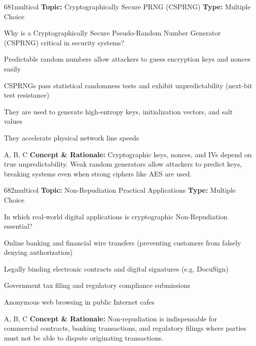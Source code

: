 \begin{qcard}{681}{multicol}
\textcolor{darkslate!75}{\small\textbf{Topic:} Cryptographically Secure PRNG (CSPRNG) \hfill \textbf{Type:} Multiple Choice}\vspace{0.4em}\par
Why is a Cryptographically Secure Pseudo-Random Number Generator (CSPRNG) critical in security systems?
\begin{qoptions}
\item Predictable random numbers allow attackers to guess encryption keys and nonces easily
\item CSPRNGs pass statistical randomness tests and exhibit unpredictability (next-bit test resistance)
\item They are used to generate high-entropy keys, initialization vectors, and salt values
\item They accelerate physical network line speeds
\end{qoptions}
\end{qcard}
\nopagebreak
\begin{explainbox}{A, B, C}
\textbf{Concept \& Rationale:} Cryptographic keys, nonces, and IVs depend on true unpredictability. Weak random generators allow attackers to predict keys, breaking systems even when strong ciphers like AES are used.
\end{explainbox}

\begin{qcard}{682}{multicol}
\textcolor{darkslate!75}{\small\textbf{Topic:} Non-Repudiation Practical Applications \hfill \textbf{Type:} Multiple Choice}\vspace{0.4em}\par
In which real-world digital applications is cryptographic Non-Repudiation essential?
\begin{qoptions}
\item Online banking and financial wire transfers (preventing customers from falsely denying authorization)
\item Legally binding electronic contracts and digital signatures (e.g. DocuSign)
\item Government tax filing and regulatory compliance submissions
\item Anonymous web browsing in public Internet cafes
\end{qoptions}
\end{qcard}
\nopagebreak
\begin{explainbox}{A, B, C}
\textbf{Concept \& Rationale:} Non-repudiation is indispensable for commercial contracts, banking transactions, and regulatory filings where parties must not be able to dispute originating transactions.
\end{explainbox}

